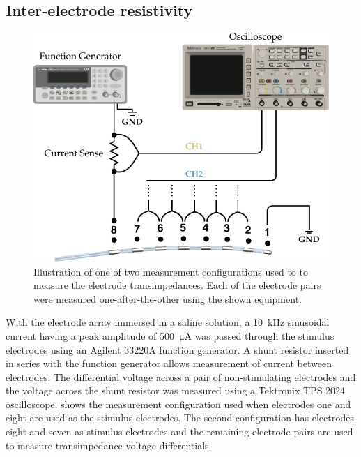    \subsection{Inter-electrode resistivity}


      \begin{figure}
        \centering
        \includegraphics{content/pt2/08-InterfaceParameters/graphics/measurement_resistorMesh}
        \caption{\label{fig:pt2-measurement_resistorMesh}Illustration of one of two measurement configurations used to to measure the electrode transimpedances. Each of the electrode pairs were measured one-after-the-other using the shown equipment.}
      \end{figure}

      With the electrode array immersed in a saline solution, a \SI{10}{\kilo\hertz} sinusoidal current having a peak amplitude of \SI{500}{\micro\ampere} was passed through the stimulus electrodes using an Agilent 33220A function generator.
      A shunt resistor inserted in series with the function generator allows measurement of current between electrodes.
      The differential voltage across a pair of non-stimulating electrodes and the voltage across the shunt resistor was measured using a Tektronix TPS 2024 oscilloscope.
       shows the measurement configuration used when electrodes one and eight are used as the stimulus electrodes.
      The second configuration has electrodes eight and seven as stimulus electrodes and the remaining electrode pairs are used to measure transimpedance voltage differentials.

